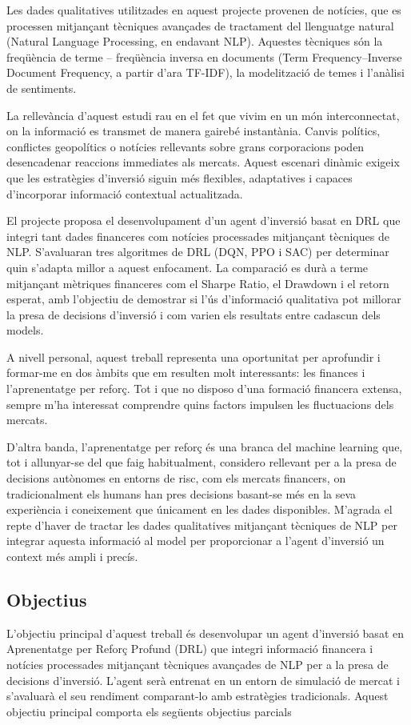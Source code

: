 \documentclass[12pt,a4paper,twoside]{book}
\begin{document}
Les dades qualitatives utilitzades en aquest projecte provenen de notícies, que es processen mitjançant tècniques avançades de tractament del llenguatge natural (Natural Language Processing, en endavant NLP). Aquestes tècniques són la freqüència de terme – freqüència inversa en documents (Term Frequency–Inverse Document Frequency, a partir d’ara TF-IDF), la modelització de temes i l’anàlisi de sentiments.

La rellevància d'aquest estudi rau en el fet que vivim en un món interconnectat, on la informació es transmet de manera gairebé instantània. Canvis polítics, conflictes geopolítics o notícies rellevants sobre grans corporacions poden desencadenar reaccions immediates als mercats. Aquest escenari dinàmic exigeix que les estratègies d'inversió siguin més flexibles, adaptatives i capaces d'incorporar informació contextual actualitzada.

El projecte proposa el desenvolupament d'un agent d'inversió basat en DRL que integri tant dades financeres com notícies processades mitjançant tècniques de NLP. S'avaluaran tres algoritmes de DRL (DQN, PPO i SAC) per determinar quin s'adapta millor a aquest enfocament. La comparació es durà a terme mitjançant mètriques financeres com el Sharpe Ratio, el Drawdown i el retorn esperat, amb l'objectiu de demostrar si l'ús d'informació qualitativa pot millorar la presa de decisions d'inversió i com varien els resultats entre cadascun dels models.

A nivell personal, aquest treball representa una oportunitat per aprofundir i formar-me en dos àmbits que em resulten molt interessants: les finances i l'aprenentatge per reforç. Tot i que no disposo d'una formació financera extensa, sempre m'ha interessat comprendre quins factors impulsen les fluctuacions dels mercats.

D'altra banda, l'aprenentatge per reforç és una branca del machine learning que, tot i allunyar-se del que faig habitualment, considero rellevant per a la presa de decisions autònomes en entorns de risc, com els mercats financers, on tradicionalment els humans han pres decisions basant-se més en la seva experiència i coneixement que únicament en les dades disponibles. M'agrada el repte d'haver de tractar les dades qualitatives mitjançant tècniques de NLP per integrar aquesta informació al model per proporcionar a l'agent d'inversió un context més ampli i precís.

\subsection{Objectius}
L'objectiu principal d'aquest treball és desenvolupar un agent d'inversió basat en Aprenentatge per Reforç Profund (DRL) que integri informació financera i notícies processades mitjançant tècniques avançades de NLP per a la presa de decisions d'inversió. L'agent serà entrenat en un entorn de simulació de mercat i s'avaluarà el seu rendiment comparant-lo amb estratègies tradicionals. Aquest objectiu principal comporta els següents objectius parcials
\end{document}
